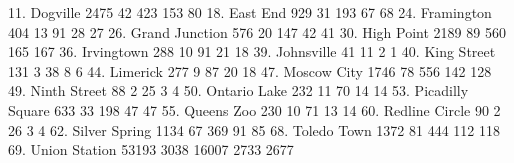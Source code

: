         11. Dogville {\VBAR}       2475          42         423         153          80
        18. East End {\VBAR}        929          31         193          67          68
      24. Framington {\VBAR}        404          13          91          28          27
  26. Grand Junction {\VBAR}        576          20         147          42          41
      30. High Point {\VBAR}       2189          89         560         165         167
      36. Irvingtown {\VBAR}        288          10          91          21          18
      39. Johnsville {\VBAR}         41                      11           2           1
     40. King Street {\VBAR}        131           3          38           8           6
        44. Limerick {\VBAR}        277           9          87          20          18
     47. Moscow City {\VBAR}       1746          78         556         142         128
    49. Ninth Street {\VBAR}         88           2          25           3           4
    50. Ontario Lake {\VBAR}        232          11          70          14          14
53. Picadilly Square {\VBAR}        633          33         198          47          47
      55. Queens Zoo {\VBAR}        230          10          71          13          14
  60. Redline Circle {\VBAR}         90           2          26           3           4
   62. Silver Spring {\VBAR}       1134          67         369          91          85
     68. Toledo Town {\VBAR}       1372          81         444         112         118
   69. Union Station {\VBAR}      53193        3038       16007        2733        2677
